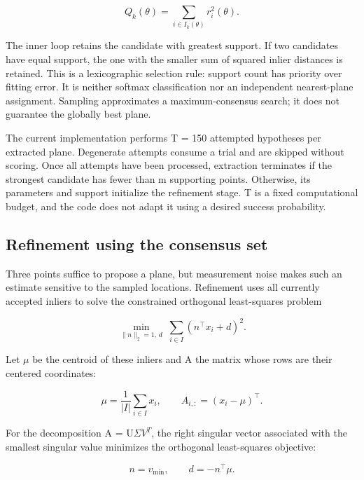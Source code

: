 \begin{equation}
Q_k(\theta)=\sum_{i\in I_k(\theta)}r_i^2(\theta).
\label{eq:7}
\end{equation}

The inner loop retains the candidate with greatest support. If two candidates have equal support, the one with the smaller sum of squared inlier distances is retained. This is a lexicographic selection rule: support count has priority over fitting error. It is neither softmax classification nor an independent nearest-plane assignment. Sampling approximates a maximum-consensus search; it does not guarantee the globally best plane.

The current implementation performs T = 150 attempted hypotheses per extracted plane. Degenerate attempts consume a trial and are skipped without scoring. Once all attempts have been processed, extraction terminates if the strongest candidate has fewer than m supporting points. Otherwise, its parameters and support initialize the refinement stage. T is a fixed computational budget, and the code does not adapt it using a desired success probability.

\subsection{Refinement using the consensus set}\label{refinement-using-the-consensus-set}

Three points suffice to propose a plane, but measurement noise makes such an estimate sensitive to the sampled locations. Refinement uses all currently accepted inliers to solve the constrained orthogonal least-squares problem

\begin{equation}
\min_{\|n\|_2=1,\,d}\;\sum_{i\in I}(n^\top x_i+d)^2.
\label{eq:8}
\end{equation}

Let \(\mu\) be the centroid of these inliers and A the matrix whose rows are their centered coordinates:

\begin{equation}
\mu=\frac{1}{|I|}\sum_{i\in I}x_i,\qquad A_{i,:}=(x_i-\mu)^\top.
\label{eq:9}
\end{equation}

For the decomposition A = U\(\Sigma\)\(V^{T}\), the right singular vector associated with the smallest singular value minimizes the orthogonal least-squares objective:

\begin{equation}
n=v_{\min},\qquad d=-n^\top\mu.
\label{eq:10}
\end{equation}

